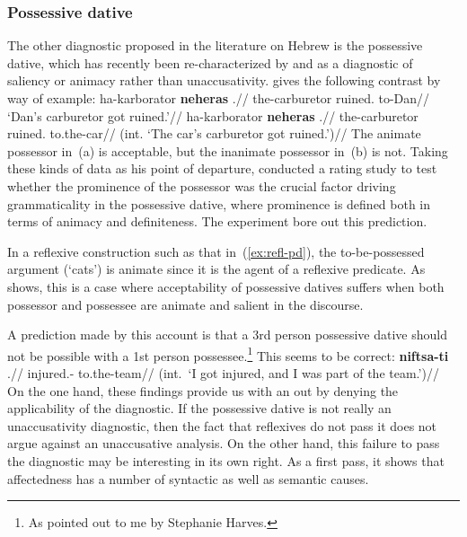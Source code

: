 		\subsubsection{Possessive dative} \label{sec:disc:unacc:pd}
The other diagnostic proposed in the literature on Hebrew is the possessive dative, which has recently been re-characterized by \cite{gafter14li} and \cite{linzen14pd,linzen16cllt} as a diagnostic of saliency or animacy rather than unaccusativity. \cite{gafter14li} gives the following contrast by way of example:
\pex
\a \begingl
\gla ha-karborator \textbf{neheras} .//
\glb the-carburetor ruined. to-Dan//
\glft `Dan's carburetor got ruined.'//
\endgl
\a \ljudge{*} \begingl
\gla ha-karborator \textbf{neheras} .//
\glb the-carburetor ruined. to.the-car//
\glft (int. `The car's carburetor got ruined.')//
\endgl
\xe
The animate possessor in~(\lastx a) is acceptable, but the inanimate possessor in~(\lastx b) is not. Taking these kinds of data as his point of departure, \cite{gafter14li} conducted a rating study to test whether the prominence of the possessor was the crucial factor driving grammaticality in the possessive dative, where prominence is defined both in terms of animacy and definiteness. The experiment bore out this prediction.

In a reflexive construction such as that in~(\ref{ex:refl-pd}), the to-be-possessed argument (`cats') is animate since it is the agent of a reflexive predicate. As \citeauthor{gafter14li} shows, this is a case where acceptability of possessive datives suffers when both possessor and possessee are animate and salient in the discourse.

A prediction made by this account is that a 3rd person possessive dative should not be possible with a 1st person possessee.\footnote{As pointed out to me by Stephanie Harves.} This seems to be correct:
\ex \ljudge{*} \begingl
\gla \textbf{niftsa-ti} .//
\glb injured.- to.the-team//
\glft (int.~`I got injured, and I was part of the team.')//
\endgl
\xe
On the one hand, these findings provide us with an out by denying the applicability of the diagnostic. If the possessive dative is not really an unaccusativity diagnostic, then the fact that reflexives do not pass it does not argue against an unaccusative analysis. On the other hand, this failure to pass the diagnostic may be interesting in its own right. As a first pass, it shows that affectedness has a number of syntactic as well as semantic causes.

